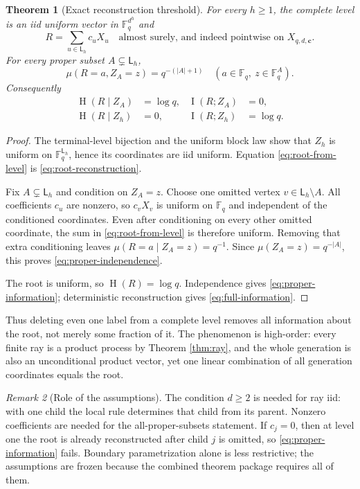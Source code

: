 \documentclass[11pt,a4paper]{amsart}
\newtheorem{theorem}{Theorem}[section]
\theoremstyle{definition}
\theoremstyle{remark}
\newtheorem{remark}[theorem]{Remark}
\newcommand{\F}{\mathbb F}
\newcommand{\Lev}{\mathsf L}
\newcommand{\I}{\operatorname{I}}
\newcommand{\Hsh}{\operatorname{H}}
\begin{document}
\begin{theorem}[Exact reconstruction threshold]\label{thm:threshold}
For every $h\geq1$, the complete level is an iid uniform vector in
$\F_q^{d^h}$ and
\begin{equation}\label{eq:root-from-level}
 R=\sum_{u\in\Lev_h}c_uX_u
 \quad\text{almost surely, and indeed pointwise on }X_{q,d,\boldsymbol c}.
\end{equation}
For every proper subset $A\subsetneq\Lev_h$,
\begin{equation}\label{eq:proper-independence}
 \mu(R=a,Z_A=z)=q^{-(|A|+1)}
 \quad(a\in\F_q,\ z\in\F_q^A).
\end{equation}
Consequently
\begin{align}
 \Hsh(R\mid Z_A)&=\log q,
 &\I(R;Z_A)&=0,\label{eq:proper-information}\\
 \Hsh(R\mid Z_h)&=0,
 &\I(R;Z_h)&=\log q.
 \label{eq:full-information}
\end{align}
\end{theorem}

\begin{proof}
The terminal-level bijection and the uniform block law show that $Z_h$ is
uniform on $\F_q^{\Lev_h}$, hence its coordinates are iid uniform.
Equation \eqref{eq:root-from-level} is
\eqref{eq:root-reconstruction}.

Fix $A\subsetneq\Lev_h$ and condition on $Z_A=z$.  Choose one omitted
vertex $v\in\Lev_h\setminus A$.  All coefficients $c_u$ are nonzero, so
$c_vX_v$ is uniform on $\F_q$ and independent of the conditioned
coordinates.  Even after conditioning on every other omitted coordinate,
the sum in \eqref{eq:root-from-level} is therefore uniform.  Removing that
extra conditioning leaves
$\mu(R=a\mid Z_A=z)=q^{-1}$.  Since
$\mu(Z_A=z)=q^{-|A|}$, this proves
\eqref{eq:proper-independence}.

The root is uniform, so $\Hsh(R)=\log q$.  Independence gives
\eqref{eq:proper-information}; deterministic reconstruction gives
\eqref{eq:full-information}.
\end{proof}

Thus deleting even one label from a complete level removes all information
about the root, not merely some fraction of it.  The phenomenon is
high-order: every finite ray is a product process by Theorem
\ref{thm:ray}, and the whole generation is also an unconditional product
vector, yet one linear combination of all generation coordinates equals the
root.

\begin{remark}[Role of the assumptions]\label{rem:assumptions}
The condition $d\geq2$ is needed for ray iid: with one child the local rule
determines that child from its parent.  Nonzero coefficients are needed for
the all-proper-subsets statement.  If $c_j=0$, then at level one the root is
already reconstructed after child $j$ is omitted, so
\eqref{eq:proper-information} fails.  Boundary parametrization alone is
less restrictive; the assumptions are frozen because the combined theorem
package requires all of them.
\end{remark}
\end{document}
